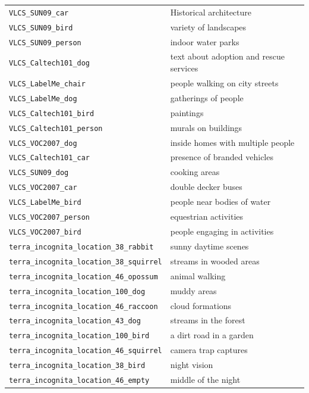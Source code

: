 \documentclass{article} %
\begin{document}
\begin{longtable}{p{} p{}}
\texttt{VLCS\_SUN09\_car} & Historical architecture \\
\texttt{VLCS\_SUN09\_bird} & variety of landscapes \\
\texttt{VLCS\_SUN09\_person} & indoor water parks \\
\texttt{VLCS\_Caltech101\_dog} & text about adoption and rescue services \\
\texttt{VLCS\_LabelMe\_chair} & people walking on city streets \\
\texttt{VLCS\_LabelMe\_dog} & gatherings of people \\
\texttt{VLCS\_Caltech101\_bird} & paintings \\
\texttt{VLCS\_Caltech101\_person} & murals on buildings \\
\texttt{VLCS\_VOC2007\_dog} & inside homes with multiple people \\
\texttt{VLCS\_Caltech101\_car} & presence of branded vehicles \\
\texttt{VLCS\_SUN09\_dog} & cooking areas \\
\texttt{VLCS\_VOC2007\_car} & double decker buses \\
\texttt{VLCS\_LabelMe\_bird} & people near bodies of water \\
\texttt{VLCS\_VOC2007\_person} & equestrian activities \\
\texttt{VLCS\_VOC2007\_bird} & people engaging in activities \\
\midrule
\texttt{terra\_incognita\_location\_38\_rabbit} & sunny daytime scenes \\
\texttt{terra\_incognita\_location\_38\_squirrel} & streams in wooded areas \\
\texttt{terra\_incognita\_location\_46\_opossum} & animal walking \\
\texttt{terra\_incognita\_location\_100\_dog} & muddy areas \\
\texttt{terra\_incognita\_location\_46\_raccoon} & cloud formations \\
\texttt{terra\_incognita\_location\_43\_dog} & streams in the forest \\
\texttt{terra\_incognita\_location\_100\_bird} & a dirt road in a garden \\
\texttt{terra\_incognita\_location\_46\_squirrel} & camera trap captures \\
\texttt{terra\_incognita\_location\_38\_bird} & night vision \\
\texttt{terra\_incognita\_location\_46\_empty} & middle of the night \\

\end{longtable}
\end{document}
